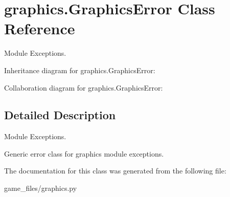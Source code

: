 \hypertarget{classgraphics_1_1GraphicsError}{}\section{graphics.\+Graphics\+Error Class Reference}
\label{classgraphics_1_1GraphicsError}


Module Exceptions.  




Inheritance diagram for graphics.\+Graphics\+Error\+:


Collaboration diagram for graphics.\+Graphics\+Error\+:


\subsection{Detailed Description}
Module Exceptions. 

\begin{DoxyVerb}Generic error class for graphics module exceptions.\end{DoxyVerb}
 

The documentation for this class was generated from the following file\+:\begin{DoxyCompactItemize}
\item 
game\+\_\+files/graphics.\+py\end{DoxyCompactItemize}
